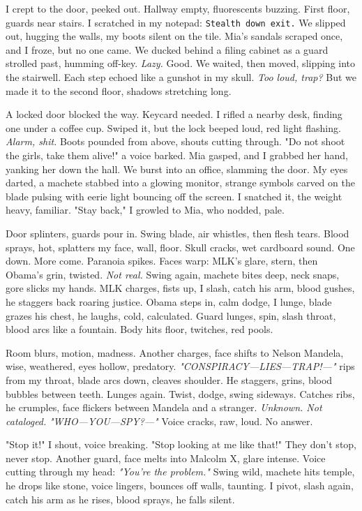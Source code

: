 \documentclass[12pt]{article}
\newcommand{\note}[1]{\texttt{#1}}
\begin{document}
{I crept to the door, peeked out. Hallway empty, fluorescents buzzing. First floor, guards near stairs. I scratched in my notepad: \note{Stealth down exit.} We slipped out, hugging the walls, my boots silent on the tile. \textnormal{Mia}’s sandals scraped once, and I froze, but no one came. We ducked behind a filing cabinet as a guard strolled past, humming off-key. \textit{Lazy.} Good. We waited, then moved, slipping into the stairwell. Each step echoed like a gunshot in my skull. \textit{Too loud, trap?} But we made it to the second floor, shadows stretching long.

A locked door blocked the way. Keycard needed. I rifled a nearby desk, finding one under a coffee cup. Swiped it, but the lock beeped loud, red light flashing. \textit{Alarm, shit.} Boots pounded from above, shouts cutting through. "Do not shoot the girls, take them alive!" a voice barked. \textnormal{Mia} gasped, and I grabbed her hand, yanking her down the hall. We burst into an office, slamming the door. My eyes darted, a machete stabbed into a glowing monitor, strange symbols carved on the blade pulsing with eerie light bouncing off the screen. I snatched it, the weight heavy, familiar. "Stay back," I growled to \textnormal{Mia}, who nodded, pale.

Door splinters, guards pour in. Swing blade, air whistles, then flesh tears. Blood sprays, hot, splatters my face, wall, floor. Skull cracks, wet cardboard sound. One down. More come. Paranoia spikes. Faces warp: \textnormal{MLK}’s glare, stern, then \textnormal{Obama}’s grin, twisted. \textit{Not real.} Swing again, machete bites deep, neck snaps, gore slicks my hands. \textnormal{MLK} charges, fists up, I slash, catch his arm, blood gushes, he staggers back roaring justice. \textnormal{Obama} steps in, calm dodge, I lunge, blade grazes his chest, he laughs, cold, calculated. Guard lunges, spin, slash throat, blood arcs like a fountain. Body hits floor, twitches, red pools.

Room blurs, motion, madness. Another charges, face shifts to \textnormal{Nelson Mandela}, wise, weathered, eyes hollow, predatory. \textit{"CONSPIRACY—LIES—TRAP!—"} rips from my throat, blade arcs down, cleaves shoulder. He staggers, grins, blood bubbles between teeth. Lunges again. Twist, dodge, swing sideways. Catches ribs, he crumples, face flickers between \textnormal{Mandela} and a stranger. \textit{Unknown. Not cataloged.} \textit{"WHO—YOU—SPY?—"} Voice cracks, raw, loud. No answer.

"Stop it!" I shout, voice breaking. "Stop looking at me like that!" They don’t stop, never stop. Another guard, face melts into \textnormal{Malcolm X}, glare intense. Voice cutting through my head: \textit{"You’re the problem."} Swing wild, machete hits temple, he drops like stone, voice lingers, bounces off walls, taunting. I pivot, slash again, catch his arm as he rises, blood sprays, he falls silent.

}
\end{document}
